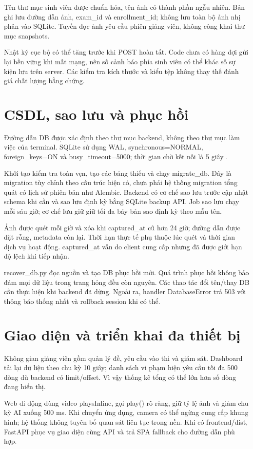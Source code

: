 Tên thư mục sinh viên được chuẩn hóa, tên ảnh có thành phần ngẫu nhiên. Bản ghi lưu đường dẫn ảnh, exam\_id và enrollment\_id; không lưu toàn bộ ảnh nhị phân vào SQLite. Tuyến đọc ảnh yêu cầu phiên giảng viên, không công khai thư mục snapshots.

Nhật ký cục bộ có thể tăng trước khi POST hoàn tất. Code chưa có hàng đợi gửi lại bền vững khi mất mạng, nên số cảnh báo phía sinh viên có thể khác số sự kiện lưu trên server. Các kiểm tra kích thước và kiểu tệp không thay thế đánh giá chất lượng bằng chứng.

\section{CSDL, sao lưu và phục hồi}
Đường dẫn DB được xác định theo thư mục backend, không theo thư mục làm việc của terminal. SQLite sử dụng WAL, synchronous=NORMAL, foreign\_keys=ON và busy\_timeout=5000; thời gian chờ kết nối là 5 giây \cite{sqlitewal}.

Khởi tạo kiểm tra toàn vẹn, tạo các bảng thiếu và chạy migrate\_db. Đây là migration tùy chỉnh theo cấu trúc hiện có, chưa phải hệ thống migration tổng quát có lịch sử phiên bản như Alembic. Backend có cơ chế sao lưu trước cập nhật schema khi cần và sao lưu định kỳ bằng SQLite backup API. Job sao lưu chạy mỗi sáu giờ; cơ chế lưu giữ giữ tối đa bảy bản sao định kỳ theo mẫu tên.

Ảnh được quét mỗi giờ và xóa khi captured\_at cũ hơn 24 giờ; đường dẫn được đặt rỗng, metadata còn lại. Thời hạn thực tế phụ thuộc lúc quét và thời gian dịch vụ hoạt động. captured\_at vẫn do client cung cấp nhưng đã được giới hạn độ lệch khi tiếp nhận.

recover\_db.py đọc nguồn và tạo DB phục hồi mới. Quá trình phục hồi không bảo đảm mọi dữ liệu trong trang hỏng đều còn nguyên. Các thao tác đổi tên/thay DB cần thực hiện khi backend đã dừng. Ngoài ra, handler DatabaseError trả 503 với thông báo thống nhất và rollback session khi có thể.

\section{Giao diện và triển khai đa thiết bị}
Không gian giảng viên gồm quản lý đề, yêu cầu vào thi và giám sát. Dashboard tải lại dữ liệu theo chu kỳ 10 giây; danh sách vi phạm hiện yêu cầu tối đa 500 dòng dù backend có limit/offset. Vì vậy thống kê tổng có thể lớn hơn số dòng đang hiển thị.

Web di động dùng video playsInline, gọi play() rõ ràng, giữ tỷ lệ ảnh và giảm chu kỳ AI xuống 500 ms. Khi chuyển ứng dụng, camera có thể ngừng cung cấp khung hình; hệ thống không tuyên bố quan sát liên tục trong nền. Khi có frontend/dist, FastAPI phục vụ giao diện cùng API và trả SPA fallback cho đường dẫn phù hợp.


